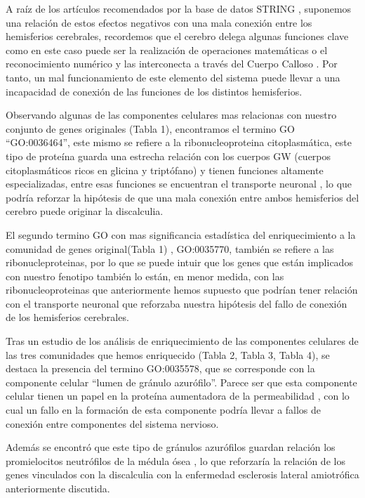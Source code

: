 A raíz de los artículos recomendados por la base de datos STRING \cite{Walterfang2014,frontotemporal}, suponemos una relación de estos efectos negativos con una mala conexión entre los hemisferios cerebrales, recordemos que el cerebro delega algunas funciones clave como en este caso puede ser la realización de operaciones matemáticas o el reconocimiento numérico y las interconecta a través del Cuerpo Calloso \cite{CorpusCallosum}. Por tanto, un mal funcionamiento de este elemento del sistema puede llevar a una incapacidad de conexión de las funciones de los distintos hemisferios.

\hfill

Observando algunas de las componentes celulares mas relacionas con nuestro conjunto de genes originales (Tabla 1),
encontramos el termino GO “GO:0036464”, este mismo se refiere a la ribonucleoproteina citoplasmática, este tipo de proteína guarda una estrecha relación con los cuerpos GW (cuerpos citoplasmáticos ricos en glicina y triptófano) y tienen funciones altamente especializadas, entre esas funciones se encuentran el transporte neuronal \cite{CytoplasmicRibo}, lo que podría reforzar la hipótesis de que una mala conexión entre ambos hemisferios del cerebro puede originar la discalculia.

\newpage

El segundo termino GO con mas significancia estadística del enriquecimiento a la comunidad de genes original(Tabla 1) , GO:0035770, también se refiere a las ribonucleproteinas, por lo que se puede intuir que los genes que están implicados con nuestro fenotipo también lo están, en menor medida, con las ribonucleoproteinas que anteriormente hemos supuesto que podrían tener relación con el transporte neuronal \cite{CytoplasmicRibo} que reforzaba nuestra hipótesis del fallo de conexión de los hemisferios cerebrales.

\hfill 

Tras un estudio de los análisis de enriquecimiento de las componentes celulares de las tres comunidades que hemos enriquecido (Tabla 2, Tabla 3, Tabla 4), se destaca la presencia del termino GO:0035578, que se corresponde con la componente celular “lumen de gránulo azurófilo”. Parece ser que esta componente celular tienen un papel en la proteína aumentadora de la permeabilidad \cite{Azurophil}, con lo cual un fallo en la formación de esta componente podría llevar a fallos de conexión entre componentes del sistema nervioso.

\hfill

Además se encontró que este tipo de gránulos azurófilos guardan relación los promielocitos neutrófilos de la médula ósea \cite{Azurophil}, lo que reforzaría la relación de los genes vinculados con la discalculia con la enfermedad  esclerosis lateral amiotrófica anteriormente discutida.